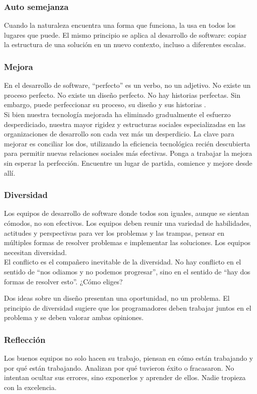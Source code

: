 \begin{spacing}{1.5}
		\subsubsection{Auto semejanza}
			Cuando la naturaleza encuentra una forma que funciona, la usa en todos los lugares que puede. El mismo principio se aplica al desarrollo de software: copiar la estructura de una solución en un nuevo contexto, incluso a diferentes escalas.
		\subsubsection{Mejora}
			En el desarrollo de software, ``perfecto'' es un verbo, no un adjetivo. No existe un proceso perfecto. No existe un diseño perfecto. No hay historias perfectas. Sin embargo, puede perfeccionar su proceso, su diseño y sus historias \cite{chap2_extreme_programming}.\\
			Si bien nuestra tecnología mejorada ha eliminado gradualmente el esfuerzo desperdiciado, nuestra mayor rigidez y estructuras sociales especializadas en las organizaciones de desarrollo son cada vez más un desperdicio. La clave para mejorar es conciliar los dos, utilizando la eficiencia tecnológica recién descubierta para permitir nuevas relaciones sociales más efectivas. Ponga a trabajar la mejora sin esperar la perfección. Encuentre un lugar de partida, comience y mejore desde allí.
		\subsubsection{Diversidad}
			Los equipos de desarrollo de software donde todos son iguales, aunque se sientan cómodos, no son efectivos. Los equipos deben reunir una variedad de habilidades, actitudes y perspectivas para ver los problemas y las trampas, pensar en múltiples formas de resolver problemas e implementar las soluciones. Los equipos necesitan diversidad.\\
			El conflicto es el compañero inevitable de la diversidad. No hay conflicto en el sentido de ``nos odiamos y no podemos progresar'', sino en el sentido de “hay dos formas de resolver esto”. ¿Cómo eliges?
			
			Dos ideas sobre un diseño presentan una oportunidad, no un problema. El principio de diversidad sugiere que los programadores deben trabajar juntos en el problema y se deben valorar ambas opiniones.
		\subsubsection{Reflecci\'{o}n}
			Los buenos equipos no solo hacen su trabajo, piensan en cómo están trabajando y por qué están trabajando. Analizan por qué tuvieron éxito o fracasaron. No intentan ocultar sus errores, sino exponerlos y aprender de ellos. Nadie tropieza con la excelencia.
			

\end{spacing}
